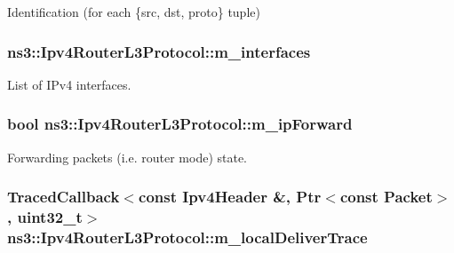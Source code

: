 Identification (for each \{src, dst, proto\} tuple) 

\hypertarget{classns3_1_1Ipv4RouterL3Protocol_a326e61efb33f76e57a147714e47b7e11}{
\subsubsection[{m\-\_\-interfaces}]{ ns3\-::\-Ipv4\-Router\-L3\-Protocol\-::m\-\_\-interfaces\hspace{0.3cm}{\ttfamily [private]}}}\label{classns3_1_1Ipv4RouterL3Protocol_a326e61efb33f76e57a147714e47b7e11}


List of I\-Pv4 interfaces. 

\hypertarget{classns3_1_1Ipv4RouterL3Protocol_a912127799da7f6a52a5f4e467af543d4}{
\subsubsection[{m\-\_\-ip\-Forward}]{\setlength{\rightskip}{0pt plus 5cm}bool ns3\-::\-Ipv4\-Router\-L3\-Protocol\-::m\-\_\-ip\-Forward\hspace{0.3cm}{\ttfamily [private]}}}\label{classns3_1_1Ipv4RouterL3Protocol_a912127799da7f6a52a5f4e467af543d4}


Forwarding packets (i.\-e. router mode) state. 

\hypertarget{classns3_1_1Ipv4RouterL3Protocol_a3bc277d7e84b260398a08beef734ef8e}{
\subsubsection[{m\-\_\-local\-Deliver\-Trace}]{\setlength{\rightskip}{0pt plus 5cm}Traced\-Callback$<$const Ipv4\-Header \&, Ptr$<$const Packet$>$, uint32\-\_\-t$>$ ns3\-::\-Ipv4\-Router\-L3\-Protocol\-::m\-\_\-local\-Deliver\-Trace\hspace{0.3cm}{\ttfamily [private]}}}\label{classns3_1_1Ipv4RouterL3Protocol_a3bc277d7e84b260398a08beef734ef8e}


